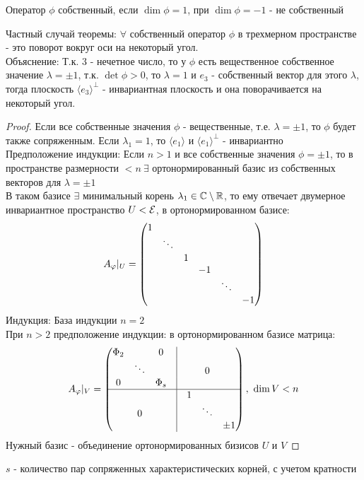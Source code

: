 \begin{definition}
    Оператор $\phi$ собственный, если $\dim \phi = 1$, при $\dim \phi = -1$ -  не собственный  
\end{definition}
Частный случай теоремы: $\forall$ собственный оператор $\phi$ в трехмерном пространстве - это поворот вокруг оси на некоторый угол.\\
Объяснение: Т.к. 3 - нечетное число, то у $\phi$ есть вещественное собственное значение $\lambda=\pm 1$, т.к. $\det \phi > 0$, то $\lambda=1$ и $e_3$ - собственный вектор для этого $\lambda$, тогда плоскость $\langle e_3 \rangle^{\bot}$ - инвариантная плоскость и она поворачивается на некоторый угол. 
\begin{proof}      
    Если все собственные значения $\phi$ - вещественные, т.е. $\lambda = \pm 1$, то $\phi$  будет также сопряженным. Если $\lambda_1 = 1$,  то $\langle e_1 \rangle$ и $\langle e_1 \rangle^\bot$  - инвариантно \\
    Предположение индукции: Если $n>1$ и все собственные значения $\phi = \pm 1$, то в пространстве размерности $<n \ \exists$ ортонормированный базис из собственных векторов для $\lambda = \pm 1$\\
    В таком базисе $\exists$ минимальный корень $\lambda_1 \in \mathbb{C}\setminus \mathbb{R}$, то ему отвечает двумерное инвариантное пространство $U < \mathcal{E}$, в ортонормированном базисе:
    $$A_{\phi}|_U = \begin{pmatrix}
        1 \\
        \null & \ddots \\
        \null & \null & 1\\
        \null & \null & \null & -1\\
        \null & \null & \null & \null & \ddots\\
        \null & \null & \null & \null & \null & -1
    \end{pmatrix}$$
    Индукция: База индукции $n = 2$\\ 
    При $n>2$ предположение индукции: в ортонормированном базисе матрица:
    $$A_\phi|_V = \begin{pmatrix}
    \Phi_2 & \null & 0 & \vline\\
    \null & \ddots & \null & \vline & \null & 0 \\
    0 & \null & \Phi_s & \vline \\ \hline 
    \null & \null & \null & \vline & 1 \\
    \null & 0 & \null & \vline & \null & \ddots \\
    \null & \null & \null & \vline & \null & \null & \pm 1 
    \end{pmatrix}, \ \dim V < n$$
    Нужный базис - объединение ортонормированных бизисов $U$ и $V$         
\end{proof}
\begin{remark}
    $s$ - количество пар сопряженных характеристических корней, с учетом кратности 
\end{remark} 
 
 